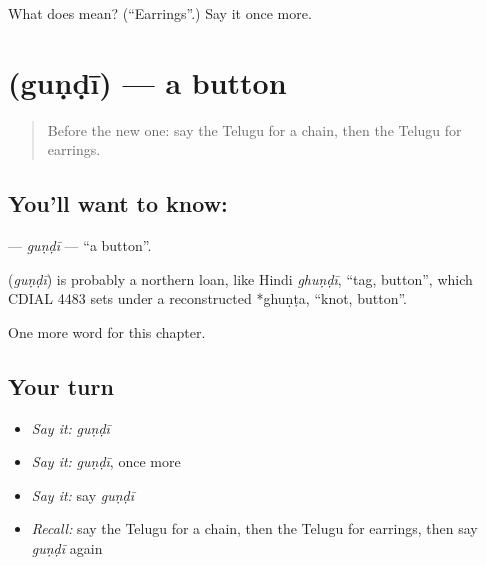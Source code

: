 \begin{tcolorbox}[breakable,colback=teal!4,colframe=teal!35!black,title={Before you move on}]
What does  mean? (\textquotedblleft{}Earrings\textquotedblright{}.) Say it once more.
\end{tcolorbox}
\section[\texorpdfstring{\te{గుండీ} (guṇḍī)}{గుండీ (guṇḍī)}]{ (guṇḍī) — a button}

\label{lesson:TE-C300-gundi}



\begin{quote}
Before the new one: say the Telugu for a chain, then the Telugu for earrings.
\end{quote}

\subsection*{You'll want to know: }
\textbf{} — \emph{guṇḍī} — \textquotedblleft{}a button\textquotedblright{}.

\begin{cousinweb}
\textbf{} (\emph{guṇḍī}) is probably a northern loan, like Hindi \emph{ghuṇḍī}, \textquotedblleft{}tag, button\textquotedblright{}, which CDIAL 4483 sets under a reconstructed *ghuṇṭa, \textquotedblleft{}knot, button\textquotedblright{}.
\end{cousinweb}

\begin{grammarlens}[title={What you've built}]
One more word for this chapter.
\end{grammarlens}

\subsection*{Your turn}
\begin{itemize}
\raggedright
  \item \emph{Say it:} \emph{guṇḍī}
  \item \emph{Say it:} \emph{guṇḍī}, once more
  \item \emph{Say it:} say \emph{guṇḍī}
  \item \emph{Recall:} say the Telugu for a chain, then the Telugu for earrings, then say \emph{guṇḍī} again
\end{itemize}

